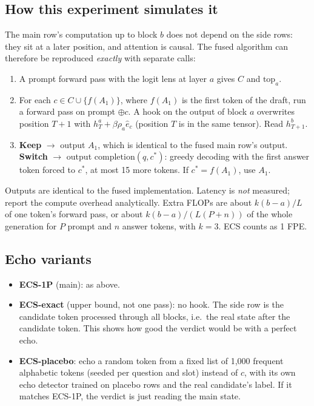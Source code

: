 \documentclass[11pt]{article}
\begin{document}
\subsection{How this experiment simulates it}
The main row's computation up to block $b$ does not depend on the side rows: they sit at a later position, and
attention is causal. The fused algorithm can therefore be reproduced \emph{exactly} with separate calls:
\begin{enumerate}
  \item A prompt forward pass with the logit lens at layer $a$ gives $C$ and $\mathrm{top}_a$.
  \item For each $c \in C \cup \{f(A_1)\}$, where $f(A_1)$ is the first token of the draft, run a forward
        pass on prompt $\oplus c$. A hook on the output of block $a$ overwrites position $T{+}1$ with
        $h^a_T + \beta\rho_a\hat e_c$ (position $T$ is in the same tensor). Read $h^b_{T+1}$.
  \item \textbf{Keep} $\rightarrow$ output $A_1$, which is identical to the fused main row's output.
        \textbf{Switch} $\rightarrow$ output $\mathrm{completion}(q, c^*)$: greedy decoding with the first
        answer token forced to $c^*$, at most 15 more tokens. If $c^* = f(A_1)$, use $A_1$.
\end{enumerate}
Outputs are identical to the fused implementation. Latency is \emph{not} measured; report the compute overhead
analytically. Extra FLOPs are about $k(b-a)/L$ of one token's forward pass, or about $k(b-a)/(L(P+n))$ of the
whole generation for $P$ prompt and $n$ answer tokens, with $k = 3$. ECS counts as 1 FPE.

\subsection{Echo variants}\label{sec:ecsabl}
\begin{itemize}
  \item \textbf{ECS-1P} (main): as above.
  \item \textbf{ECS-exact} (upper bound, not one pass): no hook. The side row is the candidate token processed
        through all blocks, i.e.\ the real state after the candidate token. This shows how good the verdict
        would be with a perfect echo.
  \item \textbf{ECS-placebo}: echo a random token from a fixed list of 1,000 frequent alphabetic tokens
        (seeded per question and slot) instead of $c$, with its own echo detector trained on placebo rows and
        the real candidate's label. If it matches ECS-1P, the verdict is just reading the main state.
\end{itemize}
\end{document}
